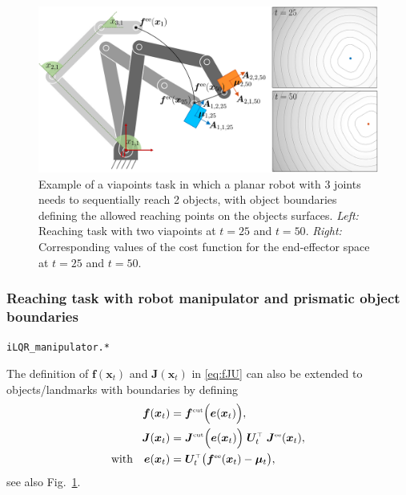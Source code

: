 \documentclass[10pt,a4paper]{article} %
\newcommand{\trsp}{{\scriptscriptstyle\top}}
\newcommand{\tp}[1]{\text{\tiny#1}}
\newcommand{\filename}[1]{\colorbox{rr2}{\color{white}\texttt{#1}}}
\begin{document}
\begin{figure}
\centering
\includegraphics[width=.6\textwidth]{images/iLQR_objectBoundaries01.jpg}
\caption{\footnotesize
Example of a viapoints task in which a planar robot with 3 joints needs to sequentially reach 2 objects, with object boundaries defining the allowed reaching points on the objects surfaces. \emph{Left:} Reaching task with two viapoints at $t=25$ and $t=50$. \emph{Right:} Corresponding values of the cost function for the end-effector space at $t=25$ and $t=50$.
}
\label{fig:iLQR_manipulator}
\end{figure}


\subsubsection{Reaching task with robot manipulator and prismatic object boundaries}\label{sec:reaching}
\begin{flushright}
\filename{iLQR\_manipulator.*}
\end{flushright}

The definition of $\bm{f}(\bm{x}_t)$ and $\bm{J}(\bm{x}_t)$ in \eqref{eq:fJU} can also be extended to objects/landmarks with boundaries by defining
\begin{align*}
	\bm{f}(\bm{x}_t) &= \bm{f}^\tp{cut}\Big( \bm{e}(\bm{x}_t) \Big), \\
	\bm{J}(\bm{x}_t) &= \bm{J}^\tp{cut}\Big( \bm{e}(\bm{x}_t) \Big) \; \bm{U}_t^\trsp \; \bm{J}^\tp{ee}(\bm{x}_t), \\
	\text{with}\quad \bm{e}(\bm{x}_t) &= \bm{U}_t^\trsp \big(\bm{f}^\tp{ee}(\bm{x}_t) - \bm{\mu}_t\big),
\end{align*}
see also Fig.~\ref{fig:iLQR_manipulator}.



\end{document}
